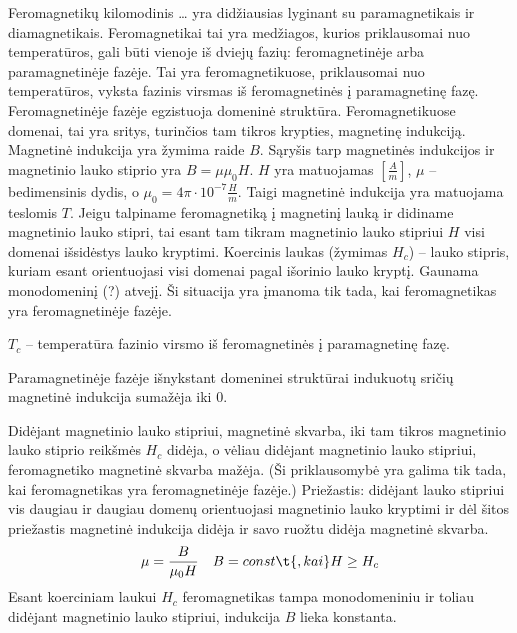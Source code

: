 Feromagnetikų kilomodinis … yra didžiausias lyginant su
paramagnetikais ir diamagnetikais. Feromagnetikai tai yra medžiagos,
kurios priklausomai nuo temperatūros, gali būti vienoje iš dviejų
fazių: feromagnetinėje arba paramagnetinėje fazėje. Tai yra
feromagnetikuose, priklausomai nuo temperatūros, vyksta fazinis virsmas
iš feromagnetinės į paramagnetinę fazę. Feromagnetinėje fazėje
egzistuoja domeninė struktūra. Feromagnetikuose domenai, tai yra
sritys, turinčios tam tikros krypties, magnetinę indukciją.
Magnetinė indukcija yra žymima raide $B$. Sąryšis tarp magnetinės
indukcijos ir magnetinio lauko stiprio yra $B = \mu\mu_{0}H$.
$H$ yra matuojamas $\left[ \frac{A}{m} \right]$, $\mu$ – bedimensinis
dydis, o $\mu_{0} = 4 \pi \cdot 10 ^{-7}\frac{H}{m}$. Taigi
magnetinė indukcija yra matuojama teslomis $T$. Jeigu talpiname
feromagnetiką į magnetinį lauką ir didiname magnetinio lauko stipri,
tai esant tam tikram magnetinio lauko stipriui $H$ visi domenai išsidėstys
lauko kryptimi. Koercinis laukas (žymimas $H_{c}$) – lauko stipris,
kuriam esant orientuojasi visi domenai pagal išorinio lauko kryptį.
Gaunama monodomeninį (?) atvejį. Ši situacija yra įmanoma tik tada,
kai feromagnetikas yra feromagnetinėje fazėje.

$T_{c}$ – temperatūra fazinio virsmo iš feromagnetinės į paramagnetinę
fazę.

Paramagnetinėje fazėje išnykstant domeninei struktūrai indukuotų
sričių magnetinė indukcija sumažėja iki 0.

Didėjant magnetinio lauko stipriui, magnetinė skvarba, iki tam tikros
magnetinio lauko stiprio reikšmės $H_{c}$ didėja, o vėliau didėjant
magnetinio lauko stipriui, feromagnetiko magnetinė skvarba mažėja.
(Ši priklausomybė yra galima tik tada, kai feromagnetikas yra 
feromagnetinėje fazėje.)
Priežastis: didėjant lauko stipriui vis daugiau ir daugiau domenų
orientuojasi magnetinio lauko kryptimi ir dėl šitos priežastis
magnetinė indukcija didėja ir savo ruožtu didėja magnetinė
skvarba.
\begin{align*}
  \mu &= \frac{B}{\mu_{0}H} & B = const\t{, kai} H \geq H_{c} \\
\end{align*}
Esant koerciniam laukui $H_{c}$ feromagnetikas tampa monodomeniniu ir
toliau didėjant magnetinio lauko stipriui, indukcija $B$ lieka konstanta.


